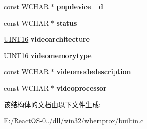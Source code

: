 \begin{DoxyCompactItemize}
const W\+C\+H\+AR $\ast$ {\bfseries pnpdevice\+\_\+id}
\item 
\mbox{\label{structrecord__videocontroller_ace4a730a88b5e449ff94c899a3269e43}} 
const W\+C\+H\+AR $\ast$ {\bfseries status}
\item 
\mbox{\label{structrecord__videocontroller_a0a66219b4f88f2715f90b11140f30ed5}} 
\hyperlink{_processor_bind_8h_a09f1a1fb2293e33483cc8d44aefb1eb1}{U\+I\+N\+T16} {\bfseries videoarchitecture}
\item 
\mbox{\label{structrecord__videocontroller_afead37c70b5977d4f164d2becfbd3172}} 
\hyperlink{_processor_bind_8h_a09f1a1fb2293e33483cc8d44aefb1eb1}{U\+I\+N\+T16} {\bfseries videomemorytype}
\item 
\mbox{\label{structrecord__videocontroller_a56c9df6e09e809a3a73d2d7a4ad69c1f}} 
const W\+C\+H\+AR $\ast$ {\bfseries videomodedescription}
\item 
\mbox{\label{structrecord__videocontroller_af03a3b914324a288f11b12946e4dacae}} 
const W\+C\+H\+AR $\ast$ {\bfseries videoprocessor}
\end{DoxyCompactItemize}


该结构体的文档由以下文件生成\+:\begin{DoxyCompactItemize}
\item 
E\+:/\+React\+O\+S-\/0../dll/win32/wbemprox/builtin.\+c\end{DoxyCompactItemize}
